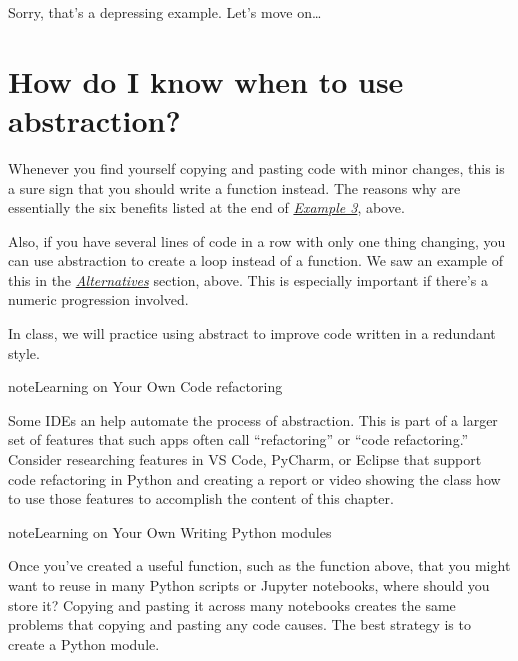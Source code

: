 \documentclass[letterpaper,10pt,english]{sphinxmanual}
\begin{document}
Sorry, that’s a depressing example.  Let’s move on…


\section{How do I know when to use abstraction?}
\label{\detokenize{chapter-7-abstraction:how-do-i-know-when-to-use-abstraction}}
Whenever you find yourself copying and pasting code with minor changes, this is a sure sign that you should write a function instead.  The reasons why are essentially the six benefits listed at the end of {\hyperref[\detokenize{chapter-7-abstraction:example-3-copying-and-pasting-code}]{\emph{Example 3}}}, above.

Also, if you have several lines of code in a row with only one thing changing, you can use abstraction to create a loop instead of a function.  We saw an example of this in the {\hyperref[\detokenize{chapter-7-abstraction:alternatives}]{\emph{Alternatives}}} section, above.  This is especially important if there’s a numeric progression involved.

In class, we will practice using abstract to improve code written in a redundant style.


\begin{sphinxadmonition}{note}{Learning on Your Own \sphinxhyphen{} Code refactoring}

Some IDEs an help automate the process of abstraction.  This is part of a larger set of features that such apps often call “refactoring” or “code refactoring.”  Consider researching features in VS Code, PyCharm, or Eclipse that support code refactoring in Python and creating a report or video showing the class how to use those features to accomplish the content of this chapter.
\end{sphinxadmonition}

\begin{sphinxadmonition}{note}{Learning on Your Own \sphinxhyphen{} Writing Python modules}

Once you’ve created a useful function, such as the  function above, that you might want to reuse in many Python scripts or Jupyter notebooks, where should you store it?  Copying and pasting it across many notebooks creates the same problems that copying and pasting any code causes.  The best strategy is to create a Python module.
\end{sphinxadmonition}
\end{document}
